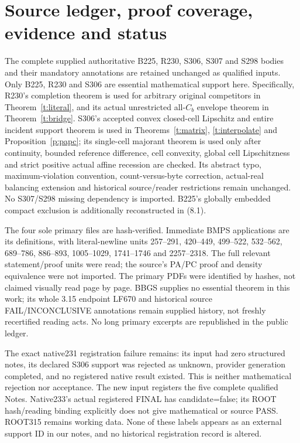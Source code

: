 \documentclass[11pt]{article}
\begin{document}
\section{Source ledger, proof coverage, evidence and status}
The complete supplied authoritative B225, R230, S306, S307 and S298 bodies and their mandatory annotations are retained unchanged as qualified inputs. Only B225, R230 and S306 are essential mathematical support here. Specifically, R230's completion theorem is used for arbitrary original competitors in Theorem~\ref{t:literal}, and its actual unrestricted all-$C_b$ envelope theorem in Theorem~\ref{t:bridge}. S306's accepted convex closed-cell Lipschitz and entire incident support theorem is used in Theorems~\ref{t:matrix}, \ref{t:interpolate} and Proposition~\ref{p:papc}; its single-cell majorant theorem is used only after continuity, bounded reference difference, cell convexity, global cell Lipschitzness and strict positive actual affine recession are checked. Its abstract typo, maximum-violation convention, count-versus-byte correction, actual-real balancing extension and historical source/reader restrictions remain unchanged. No S307/S298 missing dependency is imported. B225's globally embedded compact exclusion is additionally reconstructed in (8.1).

The four sole primary files are hash-verified. Immediate BMPS applications are its definitions, with literal-newline units 257--291, 420--449, 499--522, 532--562, 689--786, 886--893, 1005--1029, 1741--1746 and 2257--2318. The full relevant statement/proof units were read; the source's PA/PC proof and density equivalence were not imported. The primary PDFs were identified by hashes, not claimed visually read page by page. BBGS supplies no essential theorem in this work; its whole 3.15 endpoint LF670 and historical source FAIL/INCONCLUSIVE annotations remain supplied history, not freshly recertified reading acts. No long primary excerpts are republished in the public ledger.

The exact native231 registration failure remains: its input had zero structured notes, its declared S306 support was rejected as unknown, provider generation completed, and no registered native result existed. This is neither mathematical rejection nor acceptance. The new input registers the five complete qualified Notes. Native233's actual registered FINAL has candidate=false; its ROOT hash/reading binding explicitly does not give mathematical or source PASS. ROOT315 remains working data. None of these labels appears as an external support ID in our notes, and no historical registration record is altered.
\end{document}
